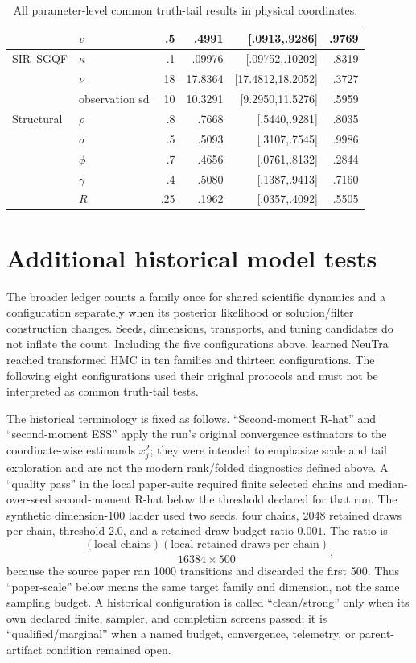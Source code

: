 \begin{table}[htbp]
\begin{tabular}{llrrrr}
&$v$&.5&.4991&[.0913,.9286]&.9769\\
\midrule
SIR--SGQF&$\kappa$&.1&.09976&[.09752,.10202]&.8319\\
&$\nu$&18&17.8364&[17.4812,18.2052]&.3727\\
&observation sd&10&10.3291&[9.2950,11.5276]&.5959\\
\midrule
Structural&$\rho$&.8&.7668&[.5440,.9281]&.8035\\
&$\sigma$&.5&.5093&[.3107,.7545]&.9986\\
&$\phi$&.7&.4656&[.0761,.8132]&.2844\\
&$\gamma$&.4&.5080&[.1387,.9413]&.7160\\
&$R$&.25&.1962&[.0357,.4092]&.5505\\
\bottomrule
\end{tabular}
\caption{All parameter-level common truth-tail results in physical coordinates.}
\label{tab:bf-neutra-all-parameters}
\end{table}

\section{Additional historical model tests}
\label{sec:bf-neutra-historical}

The broader ledger counts a family once for shared scientific dynamics and a
configuration separately when its posterior likelihood or solution/filter
construction changes.  Seeds, dimensions, transports, and tuning candidates
do not inflate the count.  Including the five configurations above, learned
NeuTra reached transformed HMC in ten families and thirteen configurations.
The following eight configurations used their original protocols and must not
be interpreted as common truth-tail tests.

The historical terminology is fixed as follows.  ``Second-moment R-hat'' and
``second-moment ESS'' apply the run's original convergence estimators to the
coordinate-wise estimands $x_j^2$; they were intended to emphasize scale and
tail exploration and are not the modern rank/folded diagnostics defined above.
A ``quality pass'' in the local paper-suite required finite selected chains and
median-over-seed second-moment R-hat below the threshold declared for that
run.  The synthetic dimension-100 ladder used two seeds, four chains, 2048
retained draws per chain, threshold 2.0, and a retained-draw budget ratio
$0.001$.  The ratio is
\begin{equation}
 \frac{(\text{local chains})(\text{local retained draws per chain})}
 {16384\times500},
\end{equation}
because the source paper ran 1000 transitions and discarded the first 500.
Thus ``paper-scale'' below means the same target family and dimension, not the
same sampling budget.  A historical configuration is called ``clean/strong''
only when its own declared finite, sampler, and completion screens passed; it
is ``qualified/marginal'' when a named budget, convergence, telemetry, or
parent-artifact condition remained open.

